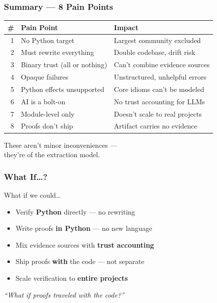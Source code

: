 \begin{frame}
\frametitle{Summary --- 8 Pain Points}
\begin{center}
\small
\begin{tabular}{@{} r l l @{}}
  \toprule
  \textbf{\#} & \textbf{Pain Point} & \textbf{Impact} \\
  \midrule
  1 & No Python target              & Largest community excluded \\
  2 & Must rewrite everything       & Double codebase, drift risk \\
  3 & Binary trust (all or nothing) & Can't combine evidence sources \\
  4 & Opaque failures               & Unstructured, unhelpful errors \\
  5 & Python effects unsupported    & Core idioms can't be modeled \\
  6 & AI is a bolt-on               & No trust accounting for LLMs \\
  7 & Module-level only             & Doesn't scale to real projects \\
  8 & Proofs don't ship             & Artifact carries no evidence \\
  \bottomrule
\end{tabular}
\end{center}
\vfill
\begin{center}
\large These aren't minor inconveniences ---\\
they're  of the extraction model.
\end{center}
\end{frame}

\begin{frame}
\frametitle{What If\ldots?}
\begin{center}
\vspace{0.5cm}
{\Large What if we could\ldots}\\[0.6cm]
\begin{itemize}
  \item[\textcolor{jugeoGreen}{$\checkmark$}] Verify \textbf{Python} directly --- no rewriting
  \item[\textcolor{jugeoGreen}{$\checkmark$}] Write proofs \textbf{in Python} --- no new language
  \item[\textcolor{jugeoGreen}{$\checkmark$}] Mix evidence sources with \textbf{trust accounting}
  \item[\textcolor{jugeoGreen}{$\checkmark$}] Ship proofs \textbf{with} the code --- not separate
  \item[\textcolor{jugeoGreen}{$\checkmark$}] Scale verification to \textbf{entire projects}
\end{itemize}
\vfill
{\large\itshape ``What if proofs traveled with the code?''}
\end{center}
\end{frame}

